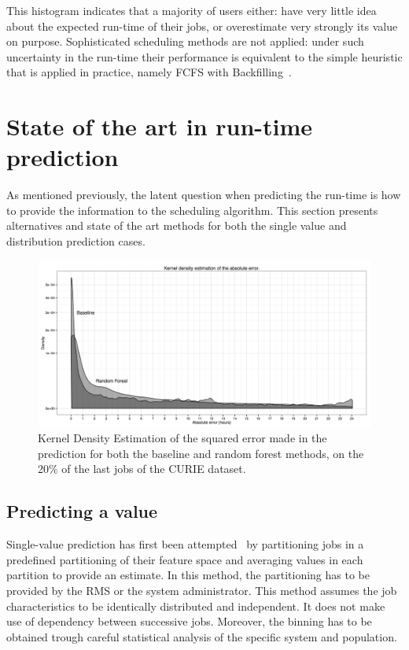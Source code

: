 \documentclass{article}
\begin{document}
This histogram indicates that a majority of users either: have very little idea about the expected run-time of their jobs, or overestimate very strongly its value on purpose. Sophisticated scheduling methods are not applied: under such uncertainty in the run-time their performance is equivalent to the simple heuristic that is applied in practice, namely FCFS with Backfilling~\cite{backfilling}.

\section{State of the art in run-time prediction}
\label{ssa}

As mentioned previously, the latent question when predicting the run-time is how to provide the information to the scheduling algorithm. This section presents alternatives and state of the art methods for both the single value and distribution prediction cases.

\begin{figure}[b]
  \centering
  \includegraphics[width=\textwidth]{error.png}
  \caption{Kernel Density Estimation of the squared error made in the prediction for both the baseline and random forest methods, on the 20\% of the last jobs of the CURIE dataset.}
    \label{fig:error}
  \end{figure}

  \subsection{Predicting a value}
  \label{sub:predicting_a_value}

  Single-value prediction has first been attempted~\cite{gibbons} by partitioning jobs in a predefined partitioning of their feature space and averaging values in each partition to provide an estimate. In this method, the partitioning has to be provided by the RMS or the system administrator. This method assumes the job characteristics to be identically distributed and independent. It does not make use of dependency between successive jobs. Moreover, the binning has to be obtained trough careful statistical analysis of the specific system and population.
\end{document}
